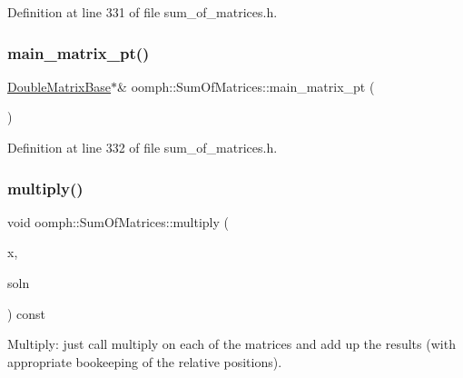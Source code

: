 Definition at line 331 of file sum\+\_\+of\+\_\+matrices.\+h.

\mbox{\label{classoomph_1_1SumOfMatrices_affa3ce9dd151fba3d33ecfffa5523c74}} 
\subsubsection{\texorpdfstring{main\+\_\+matrix\+\_\+pt()}{main\_matrix\_pt()}\hspace{0.1cm}{\footnotesize\ttfamily [2/2]}}
{\footnotesize\ttfamily \hyperlink{classoomph_1_1DoubleMatrixBase}{Double\+Matrix\+Base}$\ast$\& oomph\+::\+Sum\+Of\+Matrices\+::main\+\_\+matrix\+\_\+pt (\begin{DoxyParamCaption}{ }\end{DoxyParamCaption})\hspace{0.3cm}{\ttfamily [inline]}}



Definition at line 332 of file sum\+\_\+of\+\_\+matrices.\+h.

\mbox{\label{classoomph_1_1SumOfMatrices_ae6c97ff92220835df3c3eeb1b0a85cc5}} 
\subsubsection{\texorpdfstring{multiply()}{multiply()}}
{\footnotesize\ttfamily void oomph\+::\+Sum\+Of\+Matrices\+::multiply (\begin{DoxyParamCaption}\item[{const \hyperlink{classoomph_1_1DoubleVector}{Double\+Vector} \&}]{x,  }\item[{\hyperlink{classoomph_1_1DoubleVector}{Double\+Vector} \&}]{soln }\end{DoxyParamCaption}) const\hspace{0.3cm}{\ttfamily [virtual]}}



Multiply\+: just call multiply on each of the matrices and add up the results (with appropriate bookeeping of the relative positions). 


